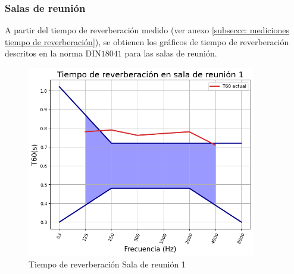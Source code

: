 \subsubsection{Salas de reunión}
A partir del tiempo de reverberación medido (ver anexo \ref{subseccc: mediciones tiempo de reverberación}), se obtienen los gráficos de tiempo de reverberación descritos en la norma DIN$18041$ para las salas de reunión.
    \begin{figure}[H]
        \centering
        \includegraphics[width=10cm]{Imagenes/DIN/DIN sala reunion 1 actual.png}
        \caption{Tiempo de reverberación Sala de reunión 1}
        \label{fig:Ttarget sala de reunion 1}
    \end{figure}

